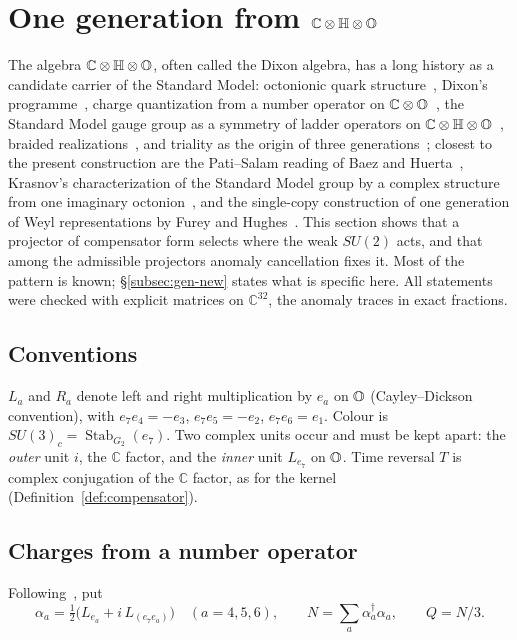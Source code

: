 \section{One generation from \texorpdfstring{$\mathbb C\otimes\mathbb H\otimes\mathbb O$}{C x H x O}}\label{sec:generation}

The algebra \(\mathbb C\otimes\mathbb H\otimes\mathbb O\), often called the Dixon algebra, has a long history as a candidate carrier of the
Standard Model: octonionic quark structure~\cite{gunaydin}, Dixon's programme~\cite{dixon}, charge quantization from a number
operator on \(\mathbb C\otimes\mathbb O\)~\cite{furey2015}, the Standard Model gauge group as a symmetry of ladder operators on
\(\mathbb C\otimes\mathbb H\otimes\mathbb O\)~\cite{furey2018}, braided realizations~\cite{gresnigt}, and triality as the origin of three
generations~\cite{boyle}; closest to the present construction are the Pati--Salam reading of Baez and Huerta~\cite{baezhuerta},
Krasnov's characterization of the Standard Model group by a complex structure from one imaginary octonion~\cite{krasnov}, and the
single-copy construction of one generation of Weyl representations by Furey and Hughes~\cite{fureyhughes}.  This section shows that a
projector of compensator form selects where the weak \(SU(2)\) acts, and that among the admissible projectors anomaly cancellation fixes
it.  Most of the pattern is known; \S\ref{subsec:gen-new} states what is specific here.  All statements were checked with explicit matrices on \(\mathbb C^{32}\), the
anomaly traces in exact fractions.

\subsection{Conventions}

\(L_a\) and \(R_a\) denote left and right multiplication by \(e_a\) on \(\mathbb O\) (Cayley--Dickson convention), with
\(e_7e_4=-e_3\), \(e_7e_5=-e_2\), \(e_7e_6=e_1\).  Colour is \(SU(3)_c=\operatorname{Stab}_{G_2}(e_7)\).  Two complex units occur and must be
kept apart: the \emph{outer} unit \(i\), the \(\mathbb C\) factor, and the \emph{inner} unit \(L_{e_7}\) on \(\mathbb O\).  Time reversal \(T\) is complex
conjugation of the \(\mathbb C\) factor, as for the kernel (Definition~\ref{def:compensator}).

\subsection{Charges from a number operator}

Following~\cite{furey2015}, put
\[
\alpha_a=\tfrac12\bigl(L_{e_a}+i\,L_{(e_7e_a)}\bigr)\quad(a=4,5,6),\qquad N=\sum_a\alpha_a^\dagger\alpha_a,\qquad Q=N/3 .
\]

